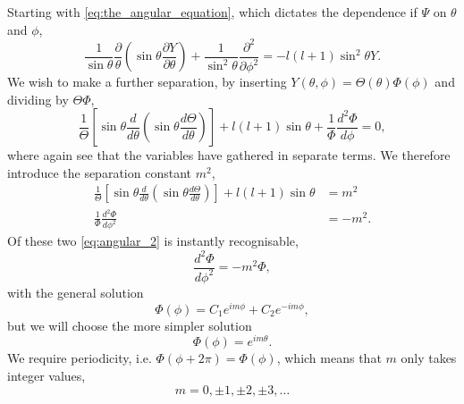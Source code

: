 Starting with \autoref{eq:the_angular_equation}, which dictates the dependence if
$\Psi$ on $\theta$ and $\phi$,
\begin{equation}
    \frac{1}{\sin\theta}\frac{\partial}{\theta} 
        \left(\sin\theta\frac{\partial Y}{\partial \theta} \right)
    +
    \frac{1}{\sin^2\theta} \frac{\partial^2}{\partial\phi^2}
    =
    -l(l + 1)\sin^2\theta Y.
\end{equation}
We wish to make a further separation, by inserting
$Y(\theta, \phi) = \Theta(\theta)\Phi(\phi)$ and dividing by $\Theta\Phi$,
\begin{equation}
    \frac{1}{\Theta}
    \left[
        \sin\theta \frac{d}{d\theta}
            \left(\sin\theta \frac{d\Theta}{d\theta} \right)
    \right]
    + l(l + 1) \sin\theta 
    +
    \frac{1}{\Phi} \frac{d^2\Phi}{d\phi} = 0,
\end{equation}
where again see that the variables have gathered in separate terms. We therefore 
introduce the separation constant $m^2$,
\begin{align}
    \label{eq:angular_1}
    \frac{1}{\Theta}
    \left[
        \sin\theta \frac{d}{d\theta}
            \left(\sin\theta \frac{d\Theta}{d\theta} \right)
    \right]
    + l(l + 1)\sin\theta &= m^2 \\
    \label{eq:angular_2}
    \frac{1}{\Phi}\frac{d^2\Phi}{d\phi^2} &= -m^2.
\end{align}
Of these two \autoref{eq:angular_2} is instantly recognisable,
\begin{equation}
    \frac{d^2\Phi}{d\phi^2} = -m^2\Phi,
\end{equation}
with the general solution
\begin{equation}
    \Phi(\phi) = C_1e^{im\phi} + C_2 e^{-im\phi},
\end{equation}
but we will choose the more simpler solution 
\begin{equation}
    \Phi(\phi) = e^{im\theta}.
\end{equation}
We require periodicity, i.e. $\Phi(\phi + 2\pi) = \Phi(\phi)$, which means that 
$m$ only takes integer values,
\begin{equation*}
    m = 0, \pm 1, \pm 2, \pm 3, \dots
\end{equation*}

